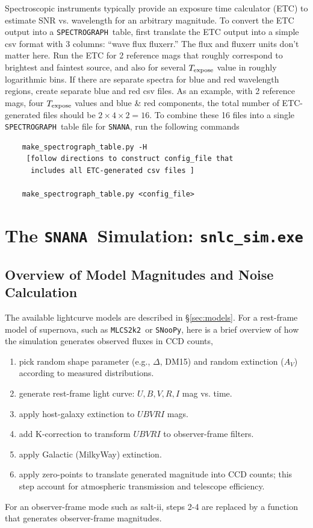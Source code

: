 \documentclass[12pt]{article}
\newcommand{\simexe}{{\tt snlc\_sim.exe}}
\newcommand{\mlcs}{{\tt MLCS2k2}}
\newcommand{\SALTII}{{\sc salt-ii}}
\newcommand{\snoopy}{{\tt SNooPy}}
\newcommand{\SPEC}{{\tt SPECTROGRAPH}}
\newcommand{\Texpose}{T_{\rm expose}}
\newcommand{\snana}{{\tt SNANA}}
\newcommand{\SNANA}{{\tt SNANA}}
\newcommand{\eff}{efficiency}
\begin{document}
{Spectroscopic instruments typically provide an exposure time calculator (ETC)
to estimate SNR vs. wavelength for an arbitrary magnitude. To convert the ETC
output into a \SPEC\ table, first translate the ETC output into a simple
csv format with 3 columns: ``wave flux fluxerr.'' 
The flux and fluxerr units don't matter here.
Run the ETC for 2 reference mags that roughly correspond to brightest and
faintest source, and also for several $\Texpose$ value in roughly logarithmic bins.
If there are separate spectra for blue and red wavelength regions,
create separate blue and red csv files. As an example, with 2 reference mags,
four $\Texpose$ values and blue \& red components, 
the total number of ETC-generated
files should be $2\times 4\times 2 = 16$.
To combine these 16 files into a single \SPEC\ table file for \SNANA,
run the following commands
\begin{verbatim}
    make_spectrograph_table.py -H
     [follow directions to construct config_file that 
      includes all ETC-generated csv files ]

    make_spectrograph_table.py <config_file>
\end{verbatim}


   \clearpage
   \section{The \snana\ Simulation:  \simexe}
   \label{sec:snlc_sim}

   \subsection{Overview of Model Magnitudes and Noise Calculation }
   \label{subsec:overview}

The available lightcurve models are described in \S\ref{sec:models}.
For a rest-frame model of supernova, such as \mlcs\ or \snoopy,
here is a brief overview of how the simulation generates
observed fluxes in CCD counts,
%
\begin{enumerate}
  \item	pick random shape parameter (e.g., $\Delta$, DM15) 
        and random extinction ($A_V$) according to measured 
        distributions.
  \item	generate rest-frame light curve: $U,B,V,R,I$ mag vs. time.
  \item	apply host-galaxy extinction to $UBVRI$ mags.
  \item	add K-correction to transform $UBVRI$  to observer-frame filters.
  \item	apply Galactic (MilkyWay) extinction.
  \item	apply zero-points to translate generated magnitude into
        CCD counts; this step account for atmospheric transmission
        and telescope \eff.
\end{enumerate}
%
For an observer-frame mode such as \SALTII,
steps 2-4 are replaced by a function that generates
observer-frame magnitudes.

}
\end{document}
